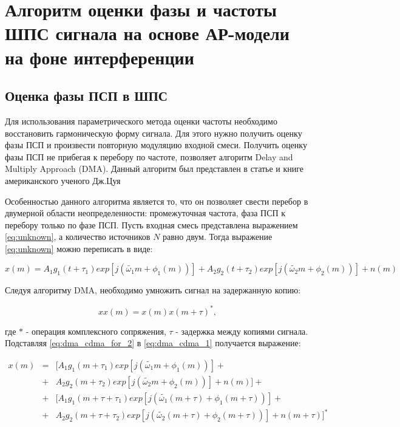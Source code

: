 \chapter{Алгоритм оценки фазы и частоты ШПС сигнала на основе АР-модели на фоне интерференции}

\section{Оценка фазы ПСП в ШПС}
\label{sec_dma_real}
Для использования параметрического метода оценки частоты необходимо восстановить гармоническую форму сигнала. Для этого
нужно получить оценку фазы ПСП и произвести повторную модуляцию входной смеси. Получить оценку фазы ПСП не прибегая к перебору по частоте,
позволяет алгоритм Delay and Multiply Approach (DMA). Данный алгоритм был представлен в статье и книге американского ученого Дж.Цуя \cite{lin_dma, tsui}

Особенностью данного алгоритма является то, что он позволяет свести перебор в двумерной области неопределенности:
промежуточная частота, фаза ПСП к перебору только по фазе ПСП.
Пусть входная смесь представлена выражением \ref{eq:unknown}, а количество источников ${N}$ равно двум. Тогда выражение \ref{eq:unknown} можно переписать в виде:
\begin{center}
\begin{equation}
	\label{eq:dma_cdma_for_2}
	x(m) =	A_1 g_1(t + \tau_1) exp \left[ j \left( \tilde{\omega_1} m + \phi_1 (m) \right) \right]
		+ A_2 g_2(t + \tau_2) exp \left[ j \left(  \tilde{\omega_2} m + \phi_2 (m) \right) \right] + n(m) 
\end{equation}
\end{center}

Следуя алгоритму DMA, необходимо умножить сигнал на задержанную копию:
\begin{center}
\begin{equation}
	\label{eq:dma_cdma_1}
	xx(m) = x(m)x(m+\tau)^*,
\end{equation}
\end{center}
где ${*}$ - операция комплексного сопряжения, ${\tau}$ - задержка между копиями сигнала. Подставляя \ref{eq:dma_cdma_for_2} в \ref{eq:dma_cdma_1} получается выражение:
\begin{center}
\begin{eqnarray}
	\label{eq:dma_cdma_2}
	x(m) & = &[ A_1 g_1(m + \tau_1) exp \left[ j \left( \tilde{\omega_1} m + \phi_1 (m) \right) \right] + \nonumber \\
	     & + & A_2 g_2(m + \tau_2) exp \left[ j \left(  \tilde{\omega_2} m + \phi_2 (m) \right) \right] + n(m) ] + \nonumber \\
	     & + & [A_1 g_1(m + \tau + \tau_1) exp \left[ j \left( \tilde{\omega_1} (m + \tau) + \phi_1 (m + \tau) \right) \right]  + \nonumber \\
	     & + & A_2 g_2(m + \tau + \tau_2) exp \left[ j \left(  \tilde{\omega_2} (m + \tau) + \phi_2 (m + \tau) \right) \right] + n(m + \tau)]^*
\end{eqnarray}
\end{center}

